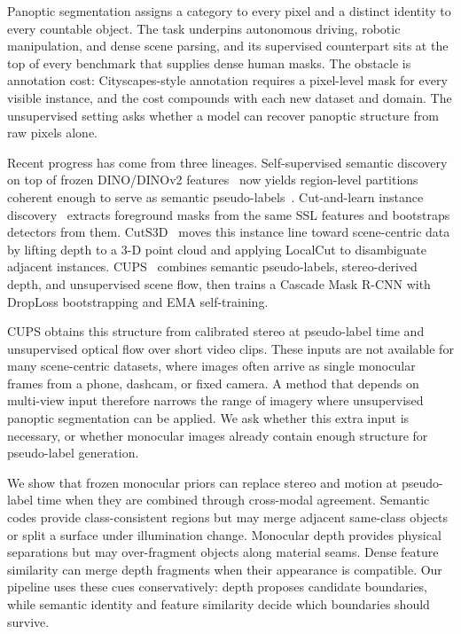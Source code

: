 \documentclass[10pt,twocolumn,letterpaper]{article}
\begin{document}
Panoptic segmentation assigns a category to every pixel and a distinct identity to every countable object. The task underpins autonomous driving, robotic manipulation, and dense scene parsing, and its supervised counterpart sits at the top of every benchmark that supplies dense human masks. The obstacle is annotation cost: Cityscapes-style annotation requires a pixel-level mask for every visible instance, and the cost compounds with each new dataset and domain. The unsupervised setting asks whether a model can recover panoptic structure from raw pixels alone.

Recent progress has come from three lineages. Self-supervised semantic discovery on top of frozen DINO/DINOv2 features~\cite{caron2021dino,oquab2024dinov2} now yields region-level partitions coherent enough to serve as semantic pseudo-labels~\cite{hamilton2022stego,kim2024cause}. Cut-and-learn instance discovery~\cite{simeoni2021lost,wang2023tokencut,wang2023cutler} extracts foreground masks from the same SSL features and bootstraps detectors from them. CutS3D~\cite{sick2025cuts3d} moves this instance line toward scene-centric data by lifting depth to a 3-D point cloud and applying LocalCut to disambiguate adjacent instances. CUPS~\cite{hahn2025cups} combines semantic pseudo-labels, stereo-derived depth, and unsupervised scene flow, then trains a Cascade Mask R-CNN with DropLoss bootstrapping and EMA self-training.

CUPS obtains this structure from calibrated stereo at pseudo-label time and unsupervised optical flow over short video clips. These inputs are not available for many scene-centric datasets, where images often arrive as single monocular frames from a phone, dashcam, or fixed camera. A method that depends on multi-view input therefore narrows the range of imagery where unsupervised panoptic segmentation can be applied. We ask whether this extra input is necessary, or whether monocular images already contain enough structure for pseudo-label generation.

We show that frozen monocular priors can replace stereo and motion at pseudo-label time when they are combined through cross-modal agreement. Semantic codes provide class-consistent regions but may merge adjacent same-class objects or split a surface under illumination change. Monocular depth provides physical separations but may over-fragment objects along material seams. Dense feature similarity can merge depth fragments when their appearance is compatible. Our pipeline uses these cues conservatively: depth proposes candidate boundaries, while semantic identity and feature similarity decide which boundaries should survive.
\end{document}
